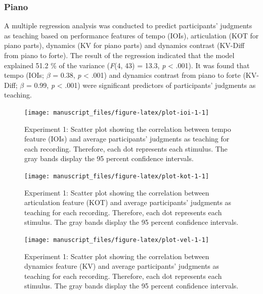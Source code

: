 \documentclass[
  man,floatsintext]{apa6}
\begin{document}
\hypertarget{piano}{%
\subsubsection{Piano}\label{piano}}

A multiple regression analysis was conducted to predict participants' judgments as teaching based on performance features of tempo (IOIs), articulation (KOT for piano parts), dynamics (KV for piano parts) and dynamics contrast (KV-Diff from piano to forte). The result of the regression indicated that the model explained 51.2 \% of the variance (\emph{F}(4, 43) = 13.3, \emph{p} \textless{} .001). It was found that tempo (IOIs; \emph{\(\beta\)} = 0.38, \emph{p} \textless{} .001) and dynamics contrast from piano to forte (KV-Diff; \emph{\(\beta\)} = 0.99, \emph{p} \textless{} .001) were significant predictors of participants' judgments as teaching.

\begin{figure}

{\centering \texttt{[image: manuscript\_files/figure-latex/plot-ioi-1-1]} 

}

\caption{\label{fig:ioi-1}Experiment 1: Scatter plot showing the correlation between tempo feature (IOIs) and average participants' judgments as teaching for each recording. Therefore, each dot represents each stimulus. The gray bands display the 95 percent confidence intervals.}\label{fig:plot-ioi-1}
\end{figure}

\begin{figure}

{\centering \texttt{[image: manuscript\_files/figure-latex/plot-kot-1-1]} 

}

\caption{\label{fig:kot-1}Experiment 1: Scatter plot showing the correlation between articulation feature (KOT) and average participants' judgments as teaching for each recording. Therefore, each dot represents each stimulus. The gray bands display the 95 percent confidence intervals.}\label{fig:plot-kot-1}
\end{figure}

\begin{figure}

{\centering \texttt{[image: manuscript\_files/figure-latex/plot-vel-1-1]} 

}

\caption{\label{fig:vel-1}Experiment 1: Scatter plot showing the correlation between dynamics feature (KV) and average participants' judgments as teaching for each recording. Therefore, each dot represents each stimulus. The gray bands display the 95 percent confidence intervals.}\label{fig:plot-vel-1}
\end{figure}
\end{document}

